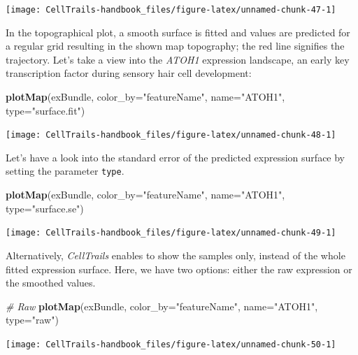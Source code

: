 \documentclass[]{book}
\newenvironment{Shaded}{\begin{snugshade}}{\end{snugshade}}
\newcommand{\KeywordTok}[1]{\textcolor[rgb]{0.13,0.29,0.53}{\textbf{#1}}}
\newcommand{\DataTypeTok}[1]{\textcolor[rgb]{0.13,0.29,0.53}{#1}}
\newcommand{\StringTok}[1]{\textcolor[rgb]{0.31,0.60,0.02}{#1}}
\newcommand{\CommentTok}[1]{\textcolor[rgb]{0.56,0.35,0.01}{\textit{#1}}}
\newcommand{\NormalTok}[1]{#1}
\theoremstyle{definition}
\theoremstyle{definition}
\theoremstyle{definition}
\theoremstyle{remark}
\begin{document}
\texttt{[image: CellTrails-handbook\_files/figure-latex/unnamed-chunk-47-1]}

In the topographical plot, a smooth surface is fitted and values are
predicted for a regular grid resulting in the shown map topography; the
red line signifies the trajectory. Let's take a view into the
\emph{ATOH1} expression landscape, an early key transcription factor
during sensory hair cell development:

\begin{Shaded}
\begin{Highlighting}[]
\KeywordTok{plotMap}\NormalTok{(exBundle, }\DataTypeTok{color_by=}\StringTok{"featureName"}\NormalTok{, }\DataTypeTok{name=}\StringTok{"ATOH1"}\NormalTok{, }\DataTypeTok{type=}\StringTok{"surface.fit"}\NormalTok{)}
\end{Highlighting}
\end{Shaded}

\texttt{[image: CellTrails-handbook\_files/figure-latex/unnamed-chunk-48-1]}

Let's have a look into the standard error of the predicted expression
surface by setting the parameter \texttt{type}.

\begin{Shaded}
\begin{Highlighting}[]
\KeywordTok{plotMap}\NormalTok{(exBundle, }\DataTypeTok{color_by=}\StringTok{"featureName"}\NormalTok{, }\DataTypeTok{name=}\StringTok{"ATOH1"}\NormalTok{, }\DataTypeTok{type=}\StringTok{"surface.se"}\NormalTok{)}
\end{Highlighting}
\end{Shaded}

\texttt{[image: CellTrails-handbook\_files/figure-latex/unnamed-chunk-49-1]}

Alternatively, \emph{CellTrails} enables to show the samples only,
instead of the whole fitted expression surface. Here, we have two
options: either the raw expression or the smoothed values.

\begin{Shaded}
\begin{Highlighting}[]
\CommentTok{# Raw}
\KeywordTok{plotMap}\NormalTok{(exBundle, }\DataTypeTok{color_by=}\StringTok{"featureName"}\NormalTok{, }\DataTypeTok{name=}\StringTok{"ATOH1"}\NormalTok{, }\DataTypeTok{type=}\StringTok{"raw"}\NormalTok{)}
\end{Highlighting}
\end{Shaded}

\texttt{[image: CellTrails-handbook\_files/figure-latex/unnamed-chunk-50-1]}
\end{document}
